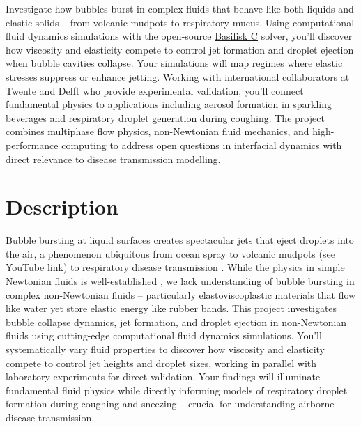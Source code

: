 \documentclass[11pt]{article}
\begin{document}
\begin{tcolorbox}[colback=mgray,colframe=mpurple,title=TL;DR]
    Investigate how bubbles burst in complex fluids that behave like both liquids and elastic solids -- from volcanic mudpots to respiratory mucus. Using computational fluid dynamics simulations with the open-source \href{https://comphy-lab.org/MultiRheoFlow}{Basilisk C} solver, you'll discover how viscosity and elasticity compete to control jet formation and droplet ejection when bubble cavities collapse. Your simulations will map regimes where elastic stresses suppress or enhance jetting. Working with international collaborators at Twente and Delft who provide experimental validation, you'll connect fundamental physics to applications including aerosol formation in sparkling beverages and respiratory droplet generation during coughing. The project combines multiphase flow physics, non-Newtonian fluid mechanics, and high-performance computing to address open questions in interfacial dynamics with direct relevance to disease transmission modelling.
\end{tcolorbox}

\section*{Description}

Bubble bursting at liquid surfaces creates spectacular jets that eject droplets into the air, a phenomenon ubiquitous from ocean spray to volcanic mudpots (see \href{https://www.youtube.com/watch?v=a9hUsVq9q7U}{YouTube link}) to respiratory disease transmission \citep{walls2017quantifying,bourouiba2021fluid,sanjay_lohse_jalaal_2021,balasubramanianBurstingBubbleElastoviscoplastic2024,dixit2024viscoelastic}. While the physics in simple Newtonian fluids is well-established \citep{duchemin2002jet, walls2015jet, deike2018dynamics, gordillo2019capillary}, we lack understanding of bubble bursting in complex non-Newtonian fluids -- particularly elastoviscoplastic materials that flow like water yet store elastic energy like rubber bands. 
This project investigates bubble collapse dynamics, jet formation, and droplet ejection in non-Newtonian fluids using cutting-edge computational fluid dynamics simulations. 
You'll systematically vary fluid properties to discover how viscosity and elasticity compete to control jet heights and droplet sizes, working in parallel with laboratory experiments for direct validation. Your findings will illuminate fundamental fluid physics while directly informing models of respiratory droplet formation during coughing and sneezing -- crucial for understanding airborne disease transmission.
\end{document}
